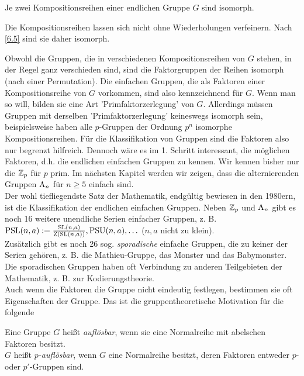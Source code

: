 \begin{satz}
Je zwei Kompositionsreihen einer endlichen Gruppe $G$ sind isomorph.
\end{satz}
\begin{beweis}
 Die Kompositionsreihen lassen sich nicht ohne Wiederholungen verfeinern. Nach \ref{6.5} sind sie daher isomorph.
\end{beweis}
\begin{bemerkung} 
\index{$\PSL$}
\index{$\PSU$}
 Obwohl die Gruppen, die in verschiedenen Kompositionsreihen von $G$ stehen, in der Regel ganz verschieden sind, sind die Faktorgruppen der Reihen isomorph (nach einer Permutation). Die einfachen Gruppen, die als Faktoren einer Kompositionsreihe von $G$ vorkommen, sind also kennzeichnend f\"ur $G$. Wenn man so will, bilden sie eine Art 'Primfaktorzerlegung' von $G$. Allerdings m\"ussen Gruppen mit derselben 'Primfaktorzerlegung' keineswegs isomorph sein, beispielsweise haben alle $p$-Gruppen der Ordnung $p^n$ isomorphe Kompositionsreihen. F\"ur die Klassifikation von Gruppen sind die Faktoren also nur begrenzt hilfreich.
Dennoch w\"are es im 1. Schritt interessant, die m\"oglichen Faktoren, d.h. die endlichen einfachen Gruppen zu kennen. Wir kennen bisher nur die $\mathbb{Z}_p$ f\"ur $p$ prim.
Im n\"achsten Kapitel werden wir zeigen, dass die alternierenden Gruppen $\operatorname{A}_n$ f\"ur $n\geq 5$ einfach sind.\\
Der wohl tiefliegendste Satz der Mathematik, endg\"ultig bewiesen in den 1980ern, ist die Klassifikation der endlichen einfachen Gruppen. Neben $\mathbb{Z}_p$ und $\operatorname{A}_n$ gibt es noch 16 weitere unendliche Serien einfacher Gruppen, z. B. $\operatorname{PSL}(n,a):=\frac{\operatorname{SL}(n,a)}{\operatorname{Z}(\operatorname{SL}(n,a))}, \operatorname{PSU}(n,a),\ldots$ ($n,a$ nicht zu klein).\\
Zus\"atzlich gibt es noch 26 sog. \emph{sporadische} einfache Gruppen, die zu keiner der Serien geh\"oren, z. B. die Mathieu-Gruppe, das Monster und das Babymonster. Die sporadischen Gruppen haben oft Verbindung zu anderen Teilgebieten der Mathematik, z. B. zur Kodierungstheorie.\\
Auch wenn die Faktoren die Gruppe nicht eindeutig festlegen, bestimmen sie oft Eigenschaften der Gruppe. Das ist die gruppentheoretische Motivation f\"ur die folgende
\end{bemerkung}
\begin{definition}
Eine Gruppe $G$ hei\ss{}t \emph{aufl\"osbar}, wenn sie eine Normalreihe mit abelschen Faktoren besitzt.\\
$G$ hei\ss{}t \emph{$p$-aufl\"osbar}, wenn $G$ eine Normalreihe besitzt, deren Faktoren entweder $p$- oder $p'$-Gruppen sind.
\end{definition}

